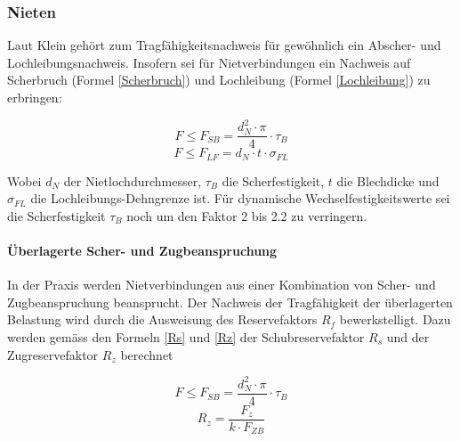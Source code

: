   \subsubsection{Nieten}
    Laut Klein \cite{klein} gehört zum Tragfähigkeitsnachweis für gewöhnlich ein Abscher- und Lochleibungsnachweis. Insofern sei für Nietverbindungen ein Nachweis auf Scherbruch (Formel \ref{Scherbruch}) und Lochleibung (Formel \ref{Lochleibung}) zu erbringen:
    \begin{multicols}{2}
      \begin{equation}
        \label{Scherbruch}
        F \leq F_{SB} = \frac{d_N^2 \cdot \pi}{4}\cdot \tau_B
      \end{equation}\break
      \begin{equation}
        \label{Lochleibung}
        F \leq F_{LF} = d_N \cdot t \cdot \sigma_{FL}
      \end{equation}
    \end{multicols}
    Wobei $d_N$ der Nietlochdurchmesser, $\tau_B$ die Scherfestigkeit, $t$ die Blechdicke und $\sigma_{FL}$ die Lochleibungs-Dehngrenze ist. Für dynamische Wechselfestigkeitswerte sei die Scherfestigkeit $\tau_B$ noch um den Faktor 2 bis 2.2 zu verringern.

    \paragraph{Überlagerte Scher- und Zugbeanspruchung}
    In der Praxis werden Nietverbindungen aus einer Kombination von Scher- und Zugbeanspruchung beansprucht. Der Nachweis der Tragfähigkeit der überlagerten Belastung wird durch die Ausweisung des Reservefaktors $R_f$ bewerkstelligt. Dazu werden gemäss den Formeln \ref{Rs} und \ref{Rz} der Schubreservefaktor $R_s$ und der Zugreservefaktor $R_z$ berechnet

    \begin{multicols}{2}
      \begin{equation}
        \label{Rs}
        F \leq F_{SB} = \frac{d_N^2 \cdot \pi}{4}\cdot \tau_B
      \end{equation}\break
      \begin{equation}
        \label{Rz}
        R_z = \frac{F_z}{k \cdot F_{ZB}}
      \end{equation}
    \end{multicols}

